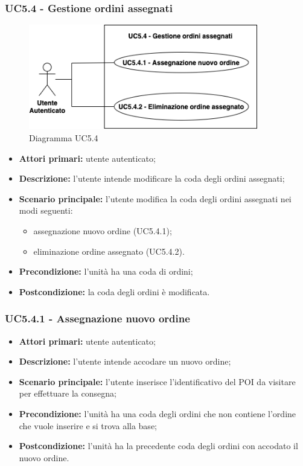 \subsubsection{UC5.4 - Gestione ordini assegnati}
\begin{figure}[h!]
    \centering
    \includegraphics[width=10cm]{images/uc5.4.png}
    \caption{Diagramma UC5.4}
\end{figure}
\begin{itemize}
    \item \textbf{Attori primari:} utente autenticato;
    \item \textbf{Descrizione:} l'utente intende modificare la coda degli ordini assegnati;
    \item \textbf{Scenario principale:} l'utente modifica la coda degli ordini assegnati nei modi seguenti:
    \begin{itemize}
        \item assegnazione nuovo ordine (UC5.4.1);
        \item eliminazione ordine assegnato (UC5.4.2).
    \end{itemize}
    \item \textbf{Precondizione:} l'unità ha una coda di ordini;
    \item \textbf{Postcondizione:} la coda degli ordini è modificata.
\end{itemize}

\subsubsection{UC5.4.1 - Assegnazione nuovo ordine}
\begin{itemize}
    \item \textbf{Attori primari:} utente autenticato;
    \item \textbf{Descrizione:} l'utente intende accodare un nuovo ordine;
    \item \textbf{Scenario principale:} l'utente inserisce l'identificativo del POI da visitare per effettuare la consegna;
    \item \textbf{Precondizione:} l'unità ha una coda degli ordini che non contiene l'ordine che vuole inserire e si trova alla base;
    \item \textbf{Postcondizione:} l'unità ha la precedente coda degli ordini con accodato il nuovo ordine.
\end{itemize}

